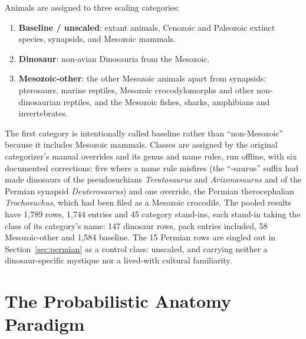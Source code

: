 \documentclass[11pt]{article}
\begin{document}
Animals are assigned to three scaling categories:
\begin{enumerate}
\item \textbf{Baseline / unscaled}: extant animals, Cenozoic and Paleozoic extinct species, synapsids, and Mesozoic mammals.
\item \textbf{Dinosaur}: non-avian Dinosauria from the Mesozoic.
\item \textbf{Mesozoic-other}: the other Mesozoic animals apart from synapsids: pterosaurs, marine reptiles, Mesozoic crocodylomorphs and other non-dinosaurian reptiles, and the Mesozoic fishes, sharks, amphibians and invertebrates.
\end{enumerate}
The first category is intentionally called baseline rather than ``non-Mesozoic'' because it includes Mesozoic mammals. Classes are assigned by the original categorizer's manual overrides and its genus and name rules, run offline, with six documented corrections: five where a name rule misfires (the ``-saurus'' suffix had made dinosaurs of the pseudosuchians \textit{Teratosaurus} and \textit{Arizonasaurus} and of the Permian synapsid \textit{Deuterosaurus}) and one override, the Permian therocephalian \textit{Trochosuchus}, which had been filed as a Mesozoic crocodile. The pooled results have 1,789 rows, 1,744 entries and 45 category stand-ins, each stand-in taking the class of its category's name: 147 dinosaur rows, pack entries included, 58 Mesozoic-other and 1,584 baseline. The 15 Permian rows are singled out in Section~\ref{sec:permian} as a control class: unscaled, and carrying neither a dinosaur-specific mystique nor a lived-with cultural familiarity.

\section{The Probabilistic Anatomy Paradigm}
\label{sec:rescale}
\end{document}

